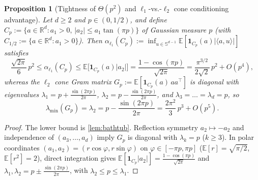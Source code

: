 \documentclass[11pt]{article}
\theoremstyle{plain}
\newtheorem{proposition}[theorem]{Proposition}
\theoremstyle{remark}
\numberwithin{equation}{section}
\newcommand{\R}{\mathbb{R}}
\newcommand{\E}{\mathbb{E}}
\newcommand{\Sph}{\mathbb{S}}
\newcommand{\ind}{\mathbf{1}}
\newcommand{\ip}[2]{\langle #1, #2 \rangle}
\begin{document}
\begin{proposition}[Tightness of $\Theta(p^2)$ and $\ell_1$-vs.-$\ell_2$ cone conditioning advantage]
  \label{prop:l1-vs-l2}
  Let $d \ge 2$ and $p \in (0, 1/2)$, and define $C_p := \{a \in \R^d : a_1 > 0,\, |a_2| \le a_1\tan(\pi p)\}$ of Gaussian measure $p$ (with $C_{1/2} := \{a \in \R^d : a_1 > 0\}$). Then $\alpha_{\ell_1}(C_p) := \inf_{u \in \Sph^{d-1}} \E[\ind_{C_p}(a)|\ip{a}{u}|]$ satisfies
  \[
    \frac{\sqrt{2\pi}}{6}\,p^2
    \le \alpha_{\ell_1}(C_p)
    \le \E\bigl[\ind_{C_p}(a)|a_2|\bigr]
    = \frac{1 - \cos(\pi p)}{\sqrt{2\pi}}
    = \frac{\pi^{3/2}}{2\sqrt{2}}\,p^2 + O(p^4),
  \]
  whereas the $\ell_2$ cone Gram matrix $G_p := \E[\ind_{C_p}(a)\,aa^\top]$ is diagonal with eigenvalues $\lambda_1 = p + \frac{\sin(2\pi p)}{2\pi}$, $\lambda_2 = p - \frac{\sin(2\pi p)}{2\pi}$, and $\lambda_3 = \dots = \lambda_d = p$, so
  \[
    \lambda_{\min}(G_p) = \lambda_2 = p - \frac{\sin(2\pi p)}{2\pi} = \frac{2\pi^2}{3}\,p^3 + O(p^5).
  \]
\end{proposition}
\begin{proof}
The lower bound is \cref{lem:bathtub}. Reflection symmetry $a_2 \mapsto -a_2$ and independence of $(a_3, \dots, a_d)$ imply $G_p$ is diagonal with $\lambda_k = p$ ($k \ge 3$). In polar coordinates $(a_1, a_2) = (r\cos\varphi, r\sin\varphi)$ on $\varphi \in [-\pi p, \pi p]$ ($\E[r] = \sqrt{\pi/2}$, $\E[r^2] = 2$), direct integration gives $\E[\ind_{C_p}|a_2|] = \frac{1 - \cos(\pi p)}{\sqrt{2\pi}}$ and $\lambda_1, \lambda_2 = p \pm \frac{\sin(2\pi p)}{2\pi}$, with $\lambda_2 \le p \le \lambda_1$.
\end{proof}
\end{document}
